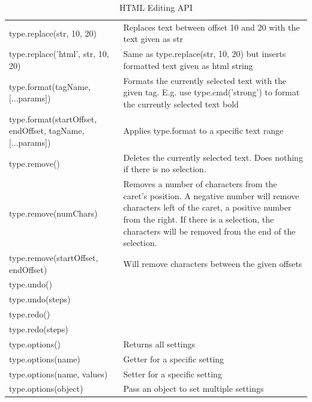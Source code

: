 \begin{table}[]
{\begin{tabularx}{\textwidth}{|l|X|}
type.replace(str, 10, 20)	&	 Replaces text between offset 10 and 20 with the text given as str \\
type.replace('html', str, 10, 20)	&	 Same as type.replace(str, 10, 20) but inserts formatted text given as html string \\ \hline

type.format(tagName, [...params])	&	 Formats the currently selected text with the given tag. E.g. use type.cmd('strong') to format the currently selected text bold \\
type.format(startOffset, endOffset, tagName, [...params])	&	 Applies type.format to a specific text range \\ \hline

type.remove()	&	 Deletes the currently selected text. Does nothing if there is no selection. \\
type.remove(numChars)	&	 Removes a number of characters from the caret's position. A negative number will remove characters left of the caret, a positive number from the right. If there is a selection, the characters will be removed from the end of the selection. \\
type.remove(startOffset, endOffset)	&	 Will remove characters between the given offsets \\ \hline

type.undo()	&	  \\
type.undo(steps)	&	  \\
type.redo()	&	  \\
type.redo(steps)	&	  \\ \hline

type.options()	&	 Returns all settings \\
type.options(name)	&	 Getter for a specific setting \\
type.options(name, values)	&	 Setter for a specific setting \\
type.options({object})	&	 Pass an object to set multiple settings \\ \hline

\end{tabularx}
}
\caption{HTML Editing API}
\label{table:editing_mode_api}
\end{table}





\clearpage
\newpage

